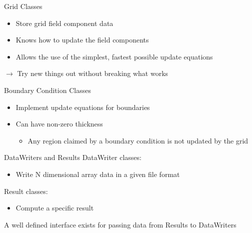 \documentclass[pdf, nototal, slideBW]{prosper}
\newcommand{\insgraphic}[2]{
  \begin{center}
    \scalebox{#1}{
      \texttt{[image: \#2]}
    }
  \end{center}
}
\begin{document}
\begin{slide}{Grid Classes}
  \begin{itemize}
  \item Store grid field component data
  \item Knows how to update the field components
  \item Allows the use of the simplest, fastest possible update
    equations 
  \end{itemize}

  $\rightarrow$ Try new things out without breaking what works

  \insgraphic{0.75}{grid-classes.eps}
\end{slide}

\begin{slide}{Boundary Condition Classes}
  \begin{itemize}
  \item Implement update equations for boundaries
  \item Can have non-zero thickness
    \begin{itemize}
    \item Any region claimed by a boundary condition is not updated by
      the grid
    \end{itemize}
  \end{itemize}
  
\insgraphic{0.5}{boundary-classes.eps}

\end{slide}

\begin{slide}{DataWriters and Results}
  DataWriter classes:
  \begin{itemize}
  \item Write N dimensional array data in a given file format
  \end{itemize}

  \vspace{0.5cm}

  Result classes:
  \begin{itemize}
  \item Compute a specific result 
  \end{itemize}
  
  A well defined interface exists for passing data from Results to
  DataWriters
  \insgraphic{0.5}{datawriter-classes.eps}

\end{slide}

  
\end{document}
